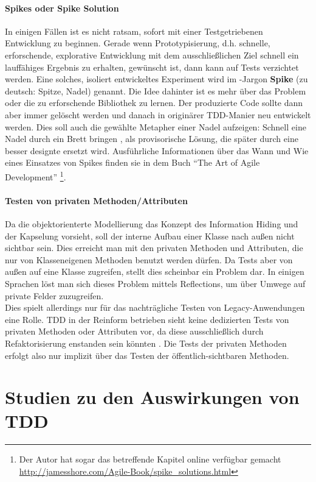   \paragraph{Spikes oder Spike Solution} In einigen Fällen ist es nicht ratsam, sofort mit einer Testgetriebenen Entwicklung zu beginnen. Gerade wenn Prototypisierung, d.h. schnelle, erforschende, explorative Entwicklung mit dem ausschließlichen Ziel schnell ein lauffähiges Ergebnis zu erhalten, gewünscht ist, dann kann auf Tests verzichtet werden. Eine solches, isoliert entwickeltes Experiment wird im -Jargon \textbf{Spike} (zu deutsch: Spitze, Nadel) genannt. Die Idee dahinter ist es mehr über das Problem oder die zu erforschende Bibliothek zu lernen. Der produzierte Code sollte dann aber immer gelöscht werden und danach in originärer TDD-Manier neu entwickelt werden. Dies soll auch die gewählte Metapher einer Nadel aufzeigen: Schnell eine Nadel durch ein Brett bringen \citep{shore_art_2007}, als provisorische Lösung, die später durch eine besser designte ersetzt wird. Ausführliche Informationen über das Wann und Wie eines Einsatzes von Spikes finden sie in dem Buch "`The Art of Agile Development"' \citep{shore_art_2007}\footnote{Der Autor hat sogar das betreffende Kapitel online verfügbar gemacht \url{http://jamesshore.com/Agile-Book/spike_solutions.html}}.

  \paragraph{Testen von privaten Methoden/Attributen} Da die objektorienterte Modellierung das Konzept des Information Hiding und der Kapselung vorsieht, soll der interne Aufbau einer Klasse nach außen nicht sichtbar sein. Dies erreicht man mit den privaten Methoden und Attributen, die nur von Klasseneigenen Methoden benutzt werden dürfen. Da Tests aber von außen auf eine Klasse zugreifen, stellt dies scheinbar ein Problem dar. In einigen Sprachen löst man sich dieses Problem mittels Reflections, um über Umwege auf private Felder zuzugreifen. \\
  Dies spielt allerdings nur für das nachträgliche Testen von Legacy-Anwendungen eine Rolle. TDD in der Reinform betrieben sieht keine dedizierten Tests von privaten Methoden oder Attributen vor, da diese ausschließlich durch Refaktorisierung enstanden sein könnten \citep{caroli_agile_2008}. Die Tests der privaten Methoden erfolgt also nur implizit über das Testen der öffentlich-sichtbaren Methoden.


\section{Studien zu den Auswirkungen von TDD}

